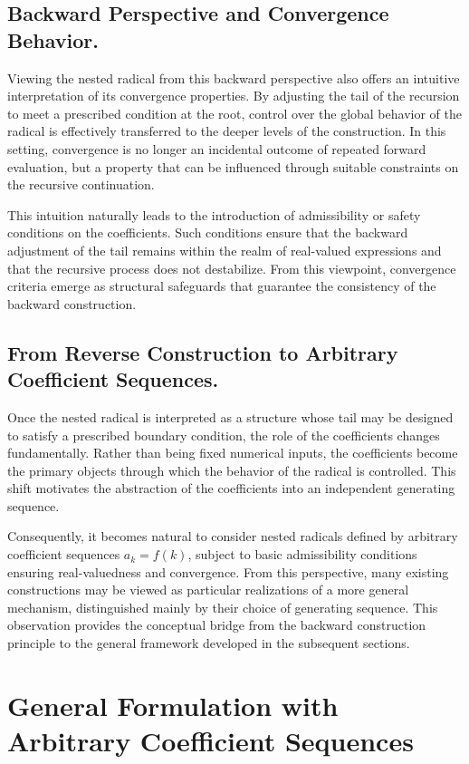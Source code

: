 \documentclass[11pt,a4paper]{amsart}
\theoremstyle{plain}
\theoremstyle{definition}
\theoremstyle{remark}
\begin{document}
\subsection*{Backward Perspective and Convergence Behavior.}
Viewing the nested radical from this backward perspective also offers an intuitive interpretation of its convergence properties. By adjusting the tail of the recursion to meet a prescribed condition at the root, control over the global behavior of the radical is effectively transferred to the deeper levels of the construction. In this setting, convergence is no longer an incidental outcome of repeated forward evaluation, but a property that can be influenced through suitable constraints on the recursive continuation.

This intuition naturally leads to the introduction of admissibility or safety conditions on the coefficients. Such conditions ensure that the backward adjustment of the tail remains within the realm of real-valued expressions and that the recursive process does not destabilize. From this viewpoint, convergence criteria emerge as structural safeguards that guarantee the consistency of the backward construction.

\subsection*{From Reverse Construction to Arbitrary Coefficient Sequences.}
Once the nested radical is interpreted as a structure whose tail may be designed to satisfy a prescribed boundary condition, the role of the coefficients changes fundamentally. Rather than being fixed numerical inputs, the coefficients become the primary objects through which the behavior of the radical is controlled. This shift motivates the abstraction of the coefficients into an independent generating sequence.

Consequently, it becomes natural to consider nested radicals defined by arbitrary coefficient sequences \( a_k = f(k) \), subject to basic admissibility conditions ensuring real-valuedness and convergence. From this perspective, many existing constructions may be viewed as particular realizations of a more general mechanism, distinguished mainly by their choice of generating sequence. This observation provides the conceptual bridge from the backward construction principle to the general framework developed in the subsequent sections.

\section{General Formulation with Arbitrary Coefficient Sequences}
\label{sec:general-framework}
\end{document}
